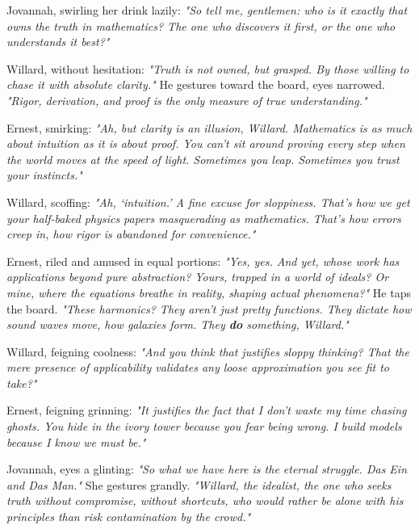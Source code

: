 \bigskip

Jovannah, swirling her drink lazily: \textit{"So tell me, gentlemen: who is it exactly that owns the truth in mathematics? The one who discovers it first, or the one who understands it best?"}

\bigskip

Willard, without hesitation: \textit{"Truth is not owned, but grasped. By those willing to chase it with absolute clarity."} He gestures toward the board, eyes narrowed. \textit{"Rigor, derivation, and proof is the only measure of true understanding."}

\bigskip

Ernest, smirking: \textit{"Ah, but clarity is an illusion, Willard. Mathematics is as much about intuition as it is about proof. You can’t sit around proving every step when the world moves at the speed of light. Sometimes you leap. Sometimes you trust your instincts."}

\bigskip

Willard, scoffing: \textit{"Ah, ‘intuition.’ A fine excuse for sloppiness. That’s how we get your half-baked physics papers masquerading as mathematics. That’s how errors creep in, how rigor is abandoned for convenience."}

\bigskip

Ernest, riled and amused in equal portions: \textit{"Yes, yes. And yet, whose work has applications beyond pure abstraction? Yours, trapped in a world of ideals? Or mine, where the equations breathe in reality, shaping actual phenomena?"} He taps the board. \textit{"These harmonics? They aren’t just pretty functions. They dictate how sound waves move, how galaxies form. They \textbf{do} something, Willard."}

\bigskip

Willard, feigning coolness: \textit{"And you think that justifies sloppy thinking? That the mere presence of applicability validates any loose approximation you see fit to take?"}

\bigskip

Ernest, feigning grinning: \textit{"It justifies the fact that I don’t waste my time chasing ghosts. You hide in the ivory tower because you fear being wrong. I build models because I know we must be."}

\bigskip

Jovannah, eyes a glinting: \textit{"So what we have here is the eternal struggle. Das Ein and Das Man."} She gestures grandly. \textit{"Willard, the idealist, the one who seeks truth without compromise, without shortcuts, who would rather be alone with his principles than risk contamination by the crowd."}


